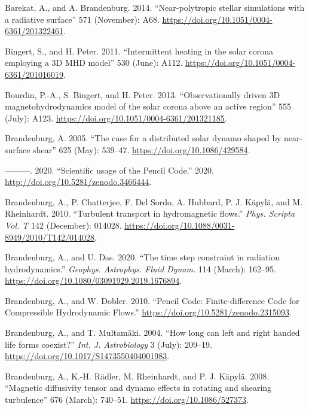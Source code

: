\documentclass[10pt,a4paper,onecolumn]{article}
\begin{document}
\leavevmode\hypertarget{ref-2014Aux5cux26A.571A.68B}{}%
Barekat, A., and A. Brandenburg. 2014. ``Near-polytropic stellar
simulations with a radiative surface'' 571 (November): A68.
\url{https://doi.org/10.1051/0004-6361/201322461}.

\leavevmode\hypertarget{ref-2011Aux5cux26A.530A.112B}{}%
Bingert, S., and H. Peter. 2011. ``Intermittent heating in the solar
corona employing a 3D MHD model'' 530 (June): A112.
\url{https://doi.org/10.1051/0004-6361/201016019}.

\leavevmode\hypertarget{ref-2013Aux5cux26A.555A.123B}{}%
Bourdin, P.-A., S. Bingert, and H. Peter. 2013. ``Observationally driven
3D magnetohydrodynamics model of the solar corona above an active
region'' 555 (July): A123.
\url{https://doi.org/10.1051/0004-6361/201321185}.

\leavevmode\hypertarget{ref-2005ApJ.625.539B}{}%
Brandenburg, A. 2005. ``The case for a distributed solar dynamo shaped
by near-surface shear'' 625 (May): 539--47.
\url{https://doi.org/10.1086/429584}.

\leavevmode\hypertarget{ref-zenodo.3466444}{}%
---------. 2020. ``Scientific usage of the Pencil Code.'' 2020.
\url{http://doi.org/10.5281/zenodo.3466444}.

\leavevmode\hypertarget{ref-2010PhST.142a4028B}{}%
Brandenburg, A., P. Chatterjee, F. Del Sordo, A. Hubbard, P. J. Käpylä,
and M. Rheinhardt. 2010. ``Turbulent transport in hydromagnetic flows.''
\emph{Phys. Scripta Vol. T} 142 (December): 014028.
\url{https://doi.org/10.1088/0031-8949/2010/T142/014028}.

\leavevmode\hypertarget{ref-2020GApFD.114.162B}{}%
Brandenburg, A., and U. Das. 2020. ``The time step constraint in
radiation hydrodynamics.'' \emph{Geophys. Astrophys. Fluid Dynam.} 114
(March): 162--95. \url{https://doi.org/10.1080/03091929.2019.1676894}.

\leavevmode\hypertarget{ref-2010ascl.soft10060B}{}%
Brandenburg, A., and W. Dobler. 2010. ``Pencil Code: Finite-difference
Code for Compressible Hydrodynamic Flows.''
\url{https://doi.org/10.5281/zenodo.2315093}.

\leavevmode\hypertarget{ref-2004IJAsB.3.209B}{}%
Brandenburg, A., and T. Multamäki. 2004. ``How long can left and right
handed life forms coexist?'' \emph{Int. J. Astrobiology} 3 (July):
209--19. \url{https://doi.org/10.1017/S1473550404001983}.

\leavevmode\hypertarget{ref-2008ApJ.676.740B}{}%
Brandenburg, A., K.-H. Rädler, M. Rheinhardt, and P. J. Käpylä. 2008.
``Magnetic diffusivity tensor and dynamo effects in rotating and
shearing turbulence'' 676 (March): 740--51.
\url{https://doi.org/10.1086/527373}.
\end{document}
